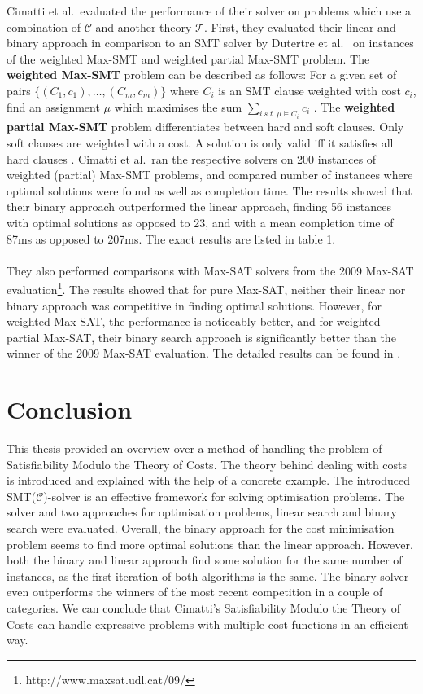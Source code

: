 \documentclass{amsart}
\theoremstyle{definition}
\theoremstyle{remark}
\numberwithin{equation}{section}
\def\T{$\mathcal{T}$}
\def\C{$\mathcal{C}$}
\begin{document}
    Cimatti et al.\ evaluated the performance of their solver on problems which use a combination of \C{} and another theory \T{}. First, they evaluated their linear and binary approach in comparison to an SMT solver by Dutertre et al.\ \cite{yices06} on instances of the weighted Max-SMT and weighted partial Max-SMT problem. The \textbf{weighted Max-SMT} problem can be described as follows: For a given set of pairs $\{\left(C_1, c_1\right), \ldots, \left(C_m, c_m\right)\}$ where $C_i$ is an SMT clause weighted with cost $c_i$, find an assignment $\mu$ which maximises the sum $\sum_{i\ s.t.\ \mu \models C_i} c_i$ \cite{Nieuwenhuis06}. The \textbf{weighted partial Max-SMT} problem differentiates between hard and soft clauses. Only soft clauses are weighted with a cost. A solution is only valid iff it satisfies all hard clauses \cite{Robinson10}. Cimatti et al.\ ran the respective solvers on 200 instances of weighted (partial) Max-SMT problems, and compared number of instances where optimal solutions were found as well as completion time. The results showed that their binary approach outperformed the linear approach, finding 56 instances with optimal solutions as opposed to 23, and with a mean completion time of 87ms as opposed to 207ms. The exact results are listed in table 1.
    \\\\
    They also performed comparisons with Max-SAT solvers from the 2009 Max-SAT evaluation\footnote{http://www.maxsat.udl.cat/09/}. The results showed that for pure Max-SAT, neither their linear nor binary approach was competitive in finding optimal solutions. However, for weighted Max-SAT, the performance is noticeably better, and for weighted partial Max-SAT, their binary search approach is significantly better than the winner of the 2009 Max-SAT evaluation. The detailed results can be found in \cite{Cimatti10}. 

  \section{Conclusion}
    \label{conclusion}
    This thesis provided an overview over a method of handling the problem of Satisfiability Modulo the Theory of Costs. The theory behind dealing with costs is introduced and explained with the help of a concrete example.
    The introduced SMT(\C{})-solver is an effective framework for solving optimisation problems.
    The solver and two approaches for optimisation problems, linear search and binary search were evaluated. 
    Overall, the binary approach for the cost minimisation problem seems to find more optimal solutions than the linear approach.
    However, both the binary and linear approach find some solution for the same number of instances, as the first iteration of both algorithms is the same.
    The binary solver even outperforms the winners of the most recent competition in a couple of categories. We can conclude that Cimatti's Satisfiability Modulo the Theory of Costs can handle expressive problems with multiple cost functions in an efficient way.



    
   
  
  
\end{document}
